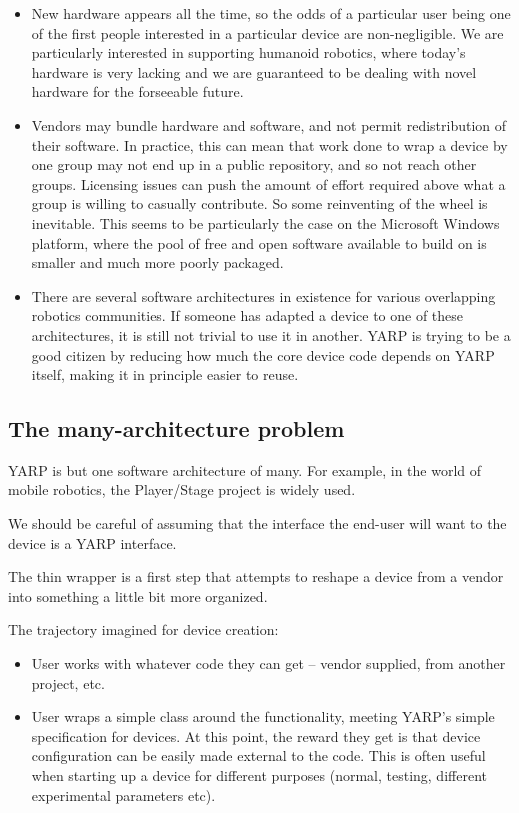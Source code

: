 \begin{itemize}

\item New hardware appears all the time, so the odds of a particular
user being one of the first people interested in a particular device are
non-negligible.  We are particularly interested in supporting humanoid
robotics, where today's hardware is very lacking and we are guaranteed
to be dealing with novel hardware for the forseeable future.

\item Vendors may bundle hardware and software, and not permit
redistribution of their software.  In practice, this can mean that
work done to wrap a device by one group may not end up in a public
repository, and so not reach other groups.  Licensing issues can push
the amount of effort required above what a group is willing to
casually contribute.  So some reinventing of the wheel is inevitable.
This seems to be particularly the case on the Microsoft Windows
platform, where the pool of free and open software available to build
on is smaller and much more poorly packaged.

\item There are several software architectures in existence for
various overlapping robotics communities.  If someone has adapted
a device to one of these architectures, it is still not trivial
to use it in another.  YARP is trying to be a good citizen by
reducing how much the core device code depends on YARP itself,
making it in principle easier to reuse.


\end{itemize}



\subsection{The many-architecture problem}

YARP is but one software architecture of many.  For example, in the
world of mobile robotics, the Player/Stage project is widely used.

We should 
be careful of assuming that the interface the end-user will want
to the device is a YARP interface.  

The thin wrapper is a first step that attempts to reshape a
device from a vendor into something a little bit more organized.

The trajectory imagined for device creation:

\begin{itemize}

\item User works with whatever code they can get -- vendor
supplied, from another project, etc.

\item User wraps a simple class around the functionality,
meeting YARP's simple specification for devices.  At this
point, the reward they get is that device configuration
can be easily made external to the code.  This is often
useful when starting up a device for different purposes
(normal, testing, different experimental parameters etc).

\end{itemize}


